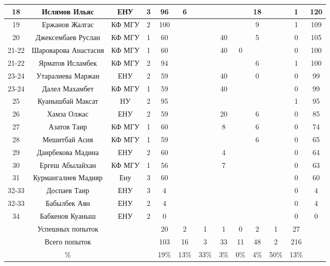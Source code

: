 \documentclass[10pt, a4paper]{article}
\begin{document}
\begin{center}
\begin{longtable}{|c|c|c|c|*{7}{c|}c|c|}
\hline
18 & Ислямов Ильяс & ЕНУ&  3 &  96   & 6  &  &  &  & 18  &  & 1 & 120\\
\hline
19 & Ержанов Жалгас & КФ МГУ&  2 &  100   &  &  &  &  & 9  &  & 1 & 109\\
\hline
20 & Джексембаев Руслан & КФ МГУ&  1 & 60  &  &  & 40  &  & 5  &  & 0 & 105\\
\hline
21-22 & Шароварова Анастасия & КФ МГУ&  1 & 60  &  &  & 40  & 0  &  &  & 0 & 100\\
\hline
21-22 & Ярматов Исламбек & КФ МГУ&  2 &  94   &  &  &  &  & 6  &  & 1 & 100\\
\hline
23-24 & Утаралиева Маржан & ЕНУ&  2 & 59  &  &  & 40  &  & 0  &  & 0 & 99\\
\hline
23-24 & Далел Махамбет & КФ МГУ&  1 & 59  &  &  & 40  &  &  &  & 0 & 99\\
\hline
25 & Куанышбай Максат & НУ &  2 &  95   &  &  &  &  &  &  & 1 & 95\\
\hline
26 & Хамза Олжас & ЕНУ&  2 & 59  &  &  & 20  &  & 6  &  & 0 & 85\\
\hline
27 & Азатов Таир & КФ МГУ&  1 & 60  &  &  & 8  &  & 6  &  & 0 & 74\\
\hline
28 & Мешитбай Асия & КФ МГУ&  1 & 59  &  &  &  &  & 6  &  & 0 & 65\\
\hline
29 & Даирбекова Мадина & ЕНУ&  2 & 60  &  &  & 4  &  &  &  & 0 & 64\\
\hline
30 & Ергеш Абылайхан & КФ МГУ&  1 & 56  &  &  & 7  &  &  &  & 0 & 63\\
\hline
31 & Курмангалиев Мадияр & Ену&  3 & 60  &  &  &  &  &  &  & 0 & 60\\
\hline
32-33 & Доспаев Таир & ЕНУ&  3 & 4  &  &  &  &  &  &  & 0 & 4\\
\hline
32-33 & Бабылбек Аян & ЕНУ&  2 & 4  &  &  &  &  &  &  & 0 & 4\\
\hline
34 & Бабкенов Куаныш & ЕНУ&  2 & 0  &  &  &  &  &  &  & 0 & 0\\
\hline
  & Успешных попыток & & & 20 & 2 & 1 & 1 & 0 & 2 & 1 & 27 &  \\
\hline
  & Всего попыток & & &103 & 16 & 3 & 33 & 11 & 48 & 2 & 216 & \\
\hline
  & \% & & & 19\% & 13\% & 33\% & 3\% & 0\% & 4\% & 50\% & 13\% &  \\
\hline
\end{longtable}
\end{center}
\end{document}
